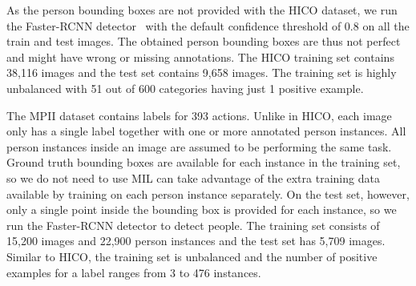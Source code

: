 \documentclass[runningheads]{llncs}
\begin{document}
As the person bounding boxes are not provided with the HICO dataset, we run the Faster-RCNN detector~\cite{ren2015faster} with the default confidence threshold of 0.8 on all the train and test images. The obtained person bounding boxes are thus not perfect and might have wrong or missing annotations. The HICO training set contains 38,116 images and the test set contains 9,658 images. The training set is highly unbalanced with 51 out of 600 categories having just 1 positive example.

The MPII dataset contains labels for 393 actions. Unlike in HICO, each image only has a single label together with one or more annotated person instances. All person instances inside an image are assumed to be performing the same task. Ground truth bounding boxes are available for each instance in the training set, so we do not need to use MIL can take advantage of the extra training data available by training on each person instance separately. On the test set, however, only a single point inside the bounding box is provided for each instance, so we run the Faster-RCNN detector to detect people. The training set consists of 15,200 images and 22,900 person instances and the test set has 5,709 images. Similar to HICO, the training set is unbalanced and the number of positive examples for a label ranges from 3 to 476 instances.
\end{document}
